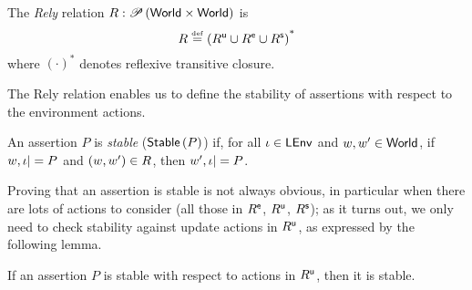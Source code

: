 \begin{definition}[Rely]
  The \emph{Rely} relation $R: \mathscr{P}\left(\textsf{World} \times \textsf{World} \right)$ is
  \[
  R \mathrel{\stackrel{\smash{\scriptscriptstyle{\mathrm{def}}}}{=}}  \left(R^{\textsf{u}} \cup R^{\textsf{e}} \cup R^{\textsf{s}} \right)^{\text{*}}
  \]
  where $(\cdot)^{\text{*}}$ denotes reflexive transitive closure.
\end{definition}

The Rely relation enables us to define the stability of assertions
with respect to the environment actions.
\begin{definition}[Stability]
  An assertion $P$ is \emph{stable} ($\textsf{Stable}\left(P\right)$) if, for all $\iota
  \in \textsf{LEnv}$ and $w, w' \in \textsf{World}$, if $w, \iota |= P$ and $(w, w')
  \in R$, then $w', \iota |= P$.
\end{definition}

Proving that an assertion is stable is not always obvious, in
particular when there are lots of actions to consider (all those in
$R^{\textsf{e}}$, $R^{\textsf{u}}$, $R^{\textsf{s}}$); as it turns out, we only need to
check stability against update actions in $R^{\textsf{u}}$, as expressed by
the following lemma.

\begin{lemma}[Stability]
  If an assertion $P$ is stable with respect to actions in $R^{\textsf{u}}$,
  then it is stable.
	 
\end{lemma}

